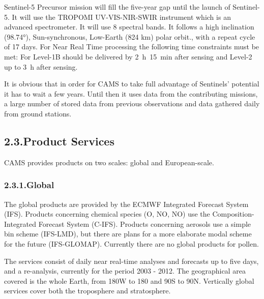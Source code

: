 \documentclass[9pt]{report}
\begin{document}
Sentinel-5 Precursor mission will fill the five-year gap until the launch of Sentinel-5. It will use the TROPOMI UV-VIS-NIR-SWIR instrument which is an advanced spectrometer. It will use 8 spectral bands. It follows a high inclination (98.74°), Sun-synchronous, Low-Earth (824 km) polar orbit., with a repeat cycle of 17 days. For Near Real Time processing the following time constraints must be met: For Level-1B should be delivered by 2 h 15 min after sensing and Level-2 up to 3 h after sensing.%

It is obvious that in order for CAMS to take full advantage of Sentinels' potential it has to wait a few years. Until then it uses data from the contributing missions, a large number of stored data from previous observations and data gathered daily from ground stations.%

\subsection{2.3.\hspace*{0.5em}Product Services}\label{sec-product-services}%

\noindent{}CAMS provides products on two scales: global and European-scale.%

\subsubsection{2.3.1.\hspace*{0.5em}Global}\label{sec-global}%

\noindent{}The global products are provided by the ECMWF Integrated Forecast System (IFS).
Products concerning chemical species (O, NO, NO) use the Composition-Integrated Forecast System (C-IFS).
Products concerning aerosols use a simple bin scheme (IFS-LMD), but there are plans for a more elaborate modal scheme for the future (IFS-GLOMAP).
Currently there are no global products for pollen.%

The services consist of daily near real-time analyses and forecasts up to five days, and a re-analysis, currently for the period 2003 - 2012.
The geographical area covered is the whole Earth, from 180\textdegree{}W to 180\textdegree{} and 90\textdegree{}S to 90\textdegree{}N.
Vertically global services cover both the troposphere and stratosphere.%
\end{document}
